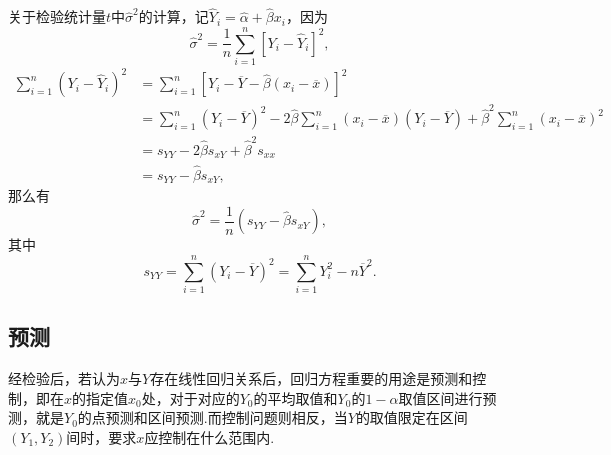 关于检验统计量\(t\)中\(\hat{\sigma}^2\)的计算，记\(\hat{Y}_i = \hat{\alpha}+\hat{\beta} x_i\)，因为\[
\hat{\sigma}^2 = \frac{1}{n} \sum\limits_{i=1}^n[Y_i-\hat{Y}_i]^2,
\]\begin{align*}
\sum\limits_{i=1}^n(Y_i-\hat{Y}_i)^2
&= \sum\limits_{i=1}^n[Y_i-\overline{Y}-\hat{\beta}(x_i-\overline{x})]^2 \\
&= \sum\limits_{i=1}^n(Y_i-\overline{Y})^2
	-2\hat{\beta} \sum\limits_{i=1}^n(x_i-\overline{x})(Y_i-\overline{Y})
	+\hat{\beta}^2 \sum\limits_{i=1}^n(x_i-\overline{x})^2 \\
&= s_{YY} - 2 \hat{\beta} s_{xY} + \hat{\beta}^2 s_{xx} \\
&= s_{YY} - \hat{\beta} s_{xY},
\end{align*}那么有\[
\hat{\sigma}^2 = \frac{1}{n} (s_{YY} - \hat{\beta} s_{xY}),
\]其中\[
s_{YY} = \sum\limits_{i=1}^n(Y_i - \overline{Y})^2
= \sum\limits_{i=1}^n{Y_i^2 - n\overline{Y}^2}.
\]

\subsection{预测}
经检验后，若认为\(x\)与\(Y\)存在线性回归关系后，回归方程重要的用途是预测和控制，即在\(x\)的指定值\(x_0\)处，对于对应的\(Y_0\)的平均取值和\(Y_0\)的\(1-\alpha\)取值区间进行预测，就是\(Y_0\)的点预测和区间预测.而控制问题则相反，当\(Y\)的取值限定在区间\((Y_1,Y_2)\)间时，要求\(x\)应控制在什么范围内.
